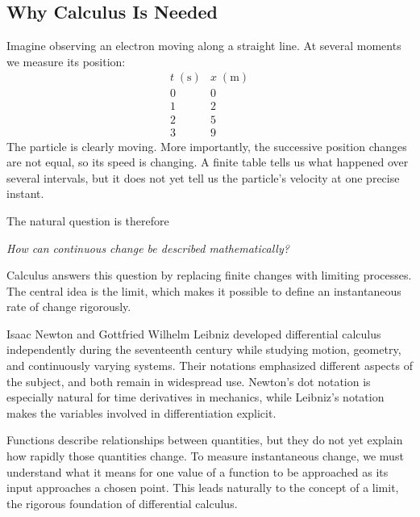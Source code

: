 \subsection{Why Calculus Is Needed}

Imagine observing an electron moving along a straight line. At several moments we measure its position:
\[
\begin{array}{c|c}
 t\;(\mathrm{s}) & x\;(\mathrm{m})\\
 \hline
 0 & 0\\
 1 & 2\\
 2 & 5\\
 3 & 9
\end{array}
\]
The particle is clearly moving. More importantly, the successive position changes are not equal, so its speed is changing. A finite table tells us what happened over several intervals, but it does not yet tell us the particle's velocity at one precise instant.

The natural question is therefore
\begin{center}
\emph{How can continuous change be described mathematically?}
\end{center}

Calculus answers this question by replacing finite changes with limiting processes. The central idea is the limit, which makes it possible to define an instantaneous rate of change rigorously.

\begin{bookhistory}
Isaac Newton and Gottfried Wilhelm Leibniz developed differential calculus independently during the seventeenth century while studying motion, geometry, and continuously varying systems. Their notations emphasized different aspects of the subject, and both remain in widespread use. Newton's dot notation is especially natural for time derivatives in mechanics, while Leibniz's notation makes the variables involved in differentiation explicit.
\end{bookhistory}

Functions describe relationships between quantities, but they do not yet explain how rapidly those quantities change. To measure instantaneous change, we must understand what it means for one value of a function to be approached as its input approaches a chosen point. This leads naturally to the concept of a limit, the rigorous foundation of differential calculus.
